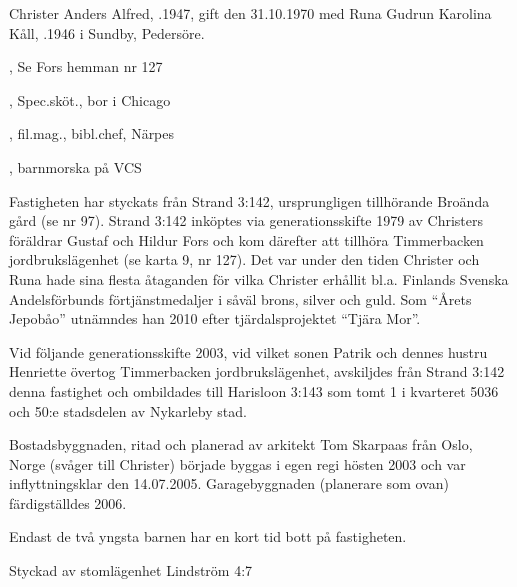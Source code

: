


Christer Anders Alfred, .1947, gift den 31.10.1970 med Runa Gudrun Karolina Kåll, .1946 i Sundby, Pedersöre.
\begin{jhchildren}
  \item {}, Se Fors hemman nr 127
  \item {}, Spec.sköt., bor i Chicago
  \item {}, fil.mag., bibl.chef, Närpes
  \item {}, barnmorska på VCS
\end{jhchildren}
Fastigheten har styckats från Strand 3:142, ursprungligen tillhörande Broända gård (se nr 97). Strand 3:142 inköptes via generationsskifte 1979 av Christers föräldrar Gustaf och Hildur Fors och kom därefter att tillhöra Timmerbacken jordbrukslägenhet (se karta 9, nr 127). Det var under den tiden Christer och Runa hade sina flesta åtaganden för vilka Christer erhållit bl.a. Finlands Svenska Andelsförbunds förtjänstmedaljer i såväl brons, silver och guld. Som ``Årets Jepobåo'' utnämndes han 2010 efter tjärdalsprojektet ``Tjära Mor''.

Vid följande generationsskifte 2003, vid vilket sonen Patrik och dennes hustru Henriette övertog Timmerbacken jordbrukslägenhet, avskiljdes från Strand 3:142 denna fastighet och ombildades till	Harisloon 3:143 som tomt 1 i kvarteret 5036 och 50:e stadsdelen av	Nykarleby stad.

Bostadsbyggnaden, ritad och planerad av arkitekt Tom Skarpaas	från Oslo, Norge (svåger till Christer) började byggas i egen regi hösten 2003 och var inflyttningsklar den 14.07.2005. Garagebyggnaden (planerare som ovan) färdigställdes 2006.

Endast de två yngsta barnen har en kort tid bott på fastigheten.



Styckad av stomlägenhet Lindström 4:7


